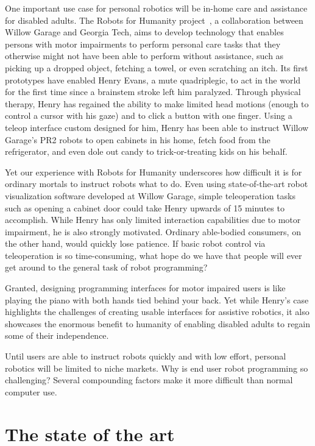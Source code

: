 \documentclass[11pt,twocolumn]{article}
\begin{document}
One important use case for personal robotics will be in-home care and assistance for disabled adults. The Robots for Humanity project~\cite{rfh}, a collaboration between Willow Garage and Georgia Tech, aims to develop technology that enables persons with motor impairments to perform personal care tasks that they otherwise might not have been able to perform without assistance, such as picking up a dropped object, fetching a towel, or even scratching an itch. Its first prototypes have enabled Henry Evans, a mute quadriplegic, to act in the world for the first time since a brainstem stroke left him paralyzed. Through physical therapy, Henry has regained the ability to make limited head motions (enough to control a cursor with his gaze) and to click a button with one finger.  Using a teleop interface custom designed for him, Henry has been able to instruct Willow Garage's PR2 robots to open cabinets in his home, fetch food from the refrigerator, and even dole out candy to trick-or-treating kids on his behalf.


Yet our experience with Robots for Humanity underscores how difficult it is for ordinary mortals to instruct robots what to do. Even using state-of-the-art robot visualization software developed at Willow Garage, simple teleoperation tasks such as opening a cabinet door could take Henry upwards of 15 minutes to accomplish.  While Henry has only limited interaction capabilities due to motor impairment, he is also strongly motivated. Ordinary able-bodied consumers, on the other hand, would quickly lose patience. If basic robot control via teleoperation is so time-consuming, what hope do we have that people will ever get around to the general task of robot programming?

Granted, designing programming interfaces for motor impaired users is like playing the piano with both hands tied behind your back. Yet while Henry's case highlights the challenges of creating usable interfaces for assistive robotics, it also showcases the enormous benefit to humanity of enabling disabled adults to regain some of their independence.

Until users are able to instruct robots quickly and with low effort, personal robotics will be limited to niche markets.  Why is end user robot programming so challenging? Several compounding factors make it more difficult than normal computer use.

\section{The state of the art}
\end{document}
